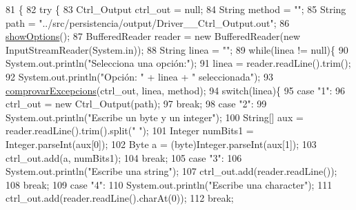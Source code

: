 \begin{DoxyCode}
81                                            \{
82         \textcolor{keywordflow}{try} \{
83             Ctrl\_Output ctrl\_out = null;
84             String method = \textcolor{stringliteral}{""};
85             String path = \textcolor{stringliteral}{"../src/persistencia/output/Driver\_\_Ctrl\_Output.out"};
86             \hyperlink{classpersistencia_1_1output_1_1Driver____Ctrl__Output_aceadcc132060c8491487c7d20a382c5b}{showOptions}();
87             BufferedReader reader = \textcolor{keyword}{new} BufferedReader(\textcolor{keyword}{new} InputStreamReader(System.in));
88             String linea = \textcolor{stringliteral}{""};
89             \textcolor{keywordflow}{while}(linea != null)\{
90                 System.out.println(\textcolor{stringliteral}{"Selecciona una opción:"});
91                 linea = reader.readLine().trim();
92                 System.out.println(\textcolor{stringliteral}{"Opción: "} + linea + \textcolor{stringliteral}{" seleccionada"});
93                 \hyperlink{classpersistencia_1_1output_1_1Driver____Ctrl__Output_a19885299457cf4049efde8b78a0f7627}{comprovarExcepcions}(ctrl\_out, linea, method);
94                 \textcolor{keywordflow}{switch}(linea)\{
95                     \textcolor{keywordflow}{case} \textcolor{stringliteral}{"1"}:
96                         ctrl\_out = \textcolor{keyword}{new} Ctrl\_Output(path);
97                     \textcolor{keywordflow}{break};
98                     \textcolor{keywordflow}{case} \textcolor{stringliteral}{"2"}:
99                         System.out.println(\textcolor{stringliteral}{"Escribe un byte y un integer"});
100                         String[] aux = reader.readLine().trim().split(\textcolor{stringliteral}{" "});
101                         Integer numBits1 = Integer.parseInt(aux[0]);
102                         Byte a = (byte)Integer.parseInt(aux[1]);
103                         ctrl\_out.add(a, numBits1);
104                     \textcolor{keywordflow}{break};
105                     \textcolor{keywordflow}{case} \textcolor{stringliteral}{"3"}:
106                         System.out.println(\textcolor{stringliteral}{"Escribe una string"});
107                         ctrl\_out.add(reader.readLine());
108                     \textcolor{keywordflow}{break};
109                     \textcolor{keywordflow}{case} \textcolor{stringliteral}{"4"}:
110                         System.out.println(\textcolor{stringliteral}{"Escribe una character"});
111                         ctrl\_out.add(reader.readLine().charAt(0));
112                     \textcolor{keywordflow}{break};

\end{DoxyCode}
